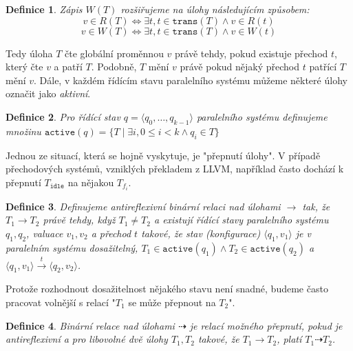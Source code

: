 \documentclass{fithesis2}
\newtheorem{definition}{Definice}
\newcommand{\tuple}[1]{\langle #1 \rangle}
\newcommand{\suchthat}{\mid}
\begin{document}
\begin{definition}
Zápis $W(T)$ rozšiřujeme na úlohy následujícím způsobem:
\begin{equation*}
v \in R(T) \Leftrightarrow \exists t, t \in \texttt{trans}(T) \land v \in R(t)
\end{equation*}
\begin{equation*}
v \in W(T) \Leftrightarrow \exists t, t \in \texttt{trans}(T) \land v \in W(t)
\end{equation*}
\end{definition}
Tedy úloha $T$ čte globální proměnnou $v$ právě tehdy, pokud existuje přechod $t$, který čte $v$ a patří $T$. Podobně, $T$ mění $v$ právě pokud nějaký přechod $t$ patřící $T$ mění $v$.
Dále, v každém řídícím stavu paralelního systému můžeme některé úlohy označit jako \textit{aktivní}.
\begin{definition}
Pro řídící stav $q = \tuple{q_0, \ldots, q_{k-1}}$ paralelního systému definujeme množinu $\texttt{active}(q) = \{ T \suchthat \exists i, 0 \leq i < k \land q_i \in T \}$
\end{definition}

Jednou ze situací, která se hojně vyskytuje, je "přepnutí úlohy". V případě přechodových systémů, vzniklých překladem z LLVM, například často dochází k přepnutí $T_\texttt{idle}$ na nějakou $T_{f_i}$. 

\newcommand{\switchto}{\rightarrow}
\newcommand{\canswitchto}{\dashrightarrow}

\begin{definition}
Definujeme antireflexivní binární relaci nad úlohami $\switchto$ tak, že $T_1 \switchto T_2$ právě tehdy, když $T_1 \neq T_2$ a existují řídící stavy paralelního systému $q_1, q_2$, valuace $v_1, v_2$ a přechod $t$ takové, že stav (konfigurace) $\tuple{q_1, v_1}$ je v paralelním systému dosažitelný, $T_1 \in \texttt{active}(q_1) \land T_2 \in \texttt{active}(q_2)$ a $\tuple{q_1, v_1} \xrightarrow{t} \tuple{q_2, v_2}$.
\end{definition}

Protože rozhodnout dosažitelnost nějakého stavu není snadné, budeme často pracovat volnější s relací "$T_1$ se může přepnout na $T_2$".

\begin{definition}
Binární relace nad úlohami $\canswitchto$ je relací možného přepnutí, pokud je antireflexivní a pro libovolné dvě úlohy $T_1, T_2$ takové, že $T_1 \switchto T_2$, platí $T_1 \canswitchto T_2$.
\end{definition}
\end{document}
